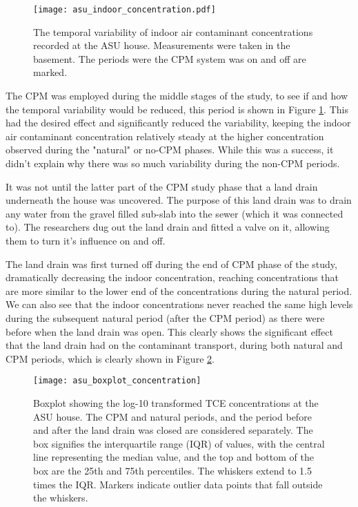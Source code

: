 \begin{figure}[htb!]
  \texttt{[image: asu\_indoor\_concentration.pdf]}
  \caption{The temporal variability of indoor air contaminant concentrations recorded at the ASU house. Measurements were taken in the basement. The periods were the CPM system was on and off are marked.}
  \label{fig:asu_indoor_concentration}
\end{figure}

The CPM was employed during the middle stages of the study, to see if and how the temporal variability would be reduced, this period is shown in Figure \ref{fig:asu_indoor_concentration}.
This had the desired effect and significantly reduced the variability, keeping the indoor air contaminant concentration relatively steady at the higher concentration observed during the "natural" or no-CPM phases.
While this was a success, it didn't explain why there was so much variability during the non-CPM periods.\par

It was not until the latter part of the CPM study phase that a land drain underneath the house was uncovered.
The purpose of this land drain was to drain any water from the gravel filled sub-slab into the sewer (which it was connected to).
The researchers dug out the land drain and fitted a valve on it, allowing them to turn it's influence on and off.\par

The land drain was first turned off during the end of CPM phase of the study, dramatically decreasing the indoor concentration, reaching concentrations that are more similar to the lower end of the concentrations during the natural period.
We can also see that the indoor concentrations never reached the same high levels during the subsequent natural period (after the CPM period) as there were before when the land drain was open.
This clearly shows the significant effect that the land drain had on the contaminant transport, during both natural and CPM periods, which is clearly shown in Figure \ref{fig:asu_concentration_boxplot}.\par

\begin{figure}[htb!]
  \texttt{[image: asu\_boxplot\_concentration]}
  \caption{Boxplot showing the log-10 transformed TCE concentrations at the ASU house. The CPM and natural periods, and the period before and after the land drain was closed are considered separately. The box signifies the interquartile range (IQR) of values, with the central line representing the median value, and the top and bottom of the box are the 25th and 75th percentiles. The whiskers extend to 1.5 times the IQR. Markers indicate outlier data points that fall outside the whiskers.}
  \label{fig:asu_concentration_boxplot}
\end{figure}

